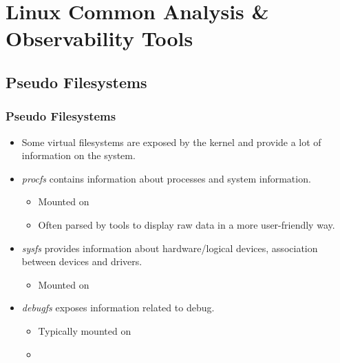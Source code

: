 \section{Linux Common Analysis \& Observability Tools}

\subsection{Pseudo Filesystems}

\begin{frame}
  \frametitle{Pseudo Filesystems}
  \begin{itemize}
    \item Some virtual filesystems are exposed by the kernel and provide a lot
          of information on the system.
    \item {\em procfs} contains information about processes and system
          information.
    \begin{itemize}
      \item Mounted on 
      \item Often parsed by tools to display raw data in a more user-friendly
            way.
    \end{itemize}
    \item {\em sysfs} provides information about hardware/logical devices,
          association between devices and drivers.
    \begin{itemize}
      \item Mounted on 
    \end{itemize}
    \item {\em debugfs} exposes information related to debug.
    \begin{itemize}
      \item Typically mounted on 
      \item {}
    \end{itemize}
  \end{itemize}
\end{frame}

